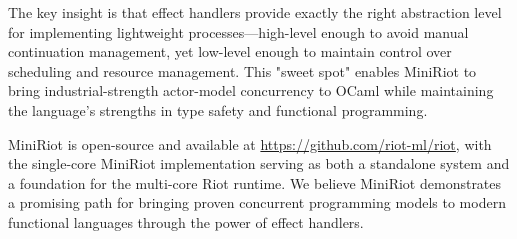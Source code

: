 \documentclass[sigplan,screen]{acmart}
\begin{document}
The key insight is that effect handlers provide exactly the right abstraction level for implementing lightweight processes—high-level enough to avoid manual continuation management, yet low-level enough to maintain control over scheduling and resource management. This "sweet spot" enables MiniRiot to bring industrial-strength actor-model concurrency to OCaml while maintaining the language's strengths in type safety and functional programming.

MiniRiot is open-source and available at \url{https://github.com/riot-ml/riot}, with the single-core MiniRiot implementation serving as both a standalone system and a foundation for the multi-core Riot runtime. We believe MiniRiot demonstrates a promising path for bringing proven concurrent programming models to modern functional languages through the power of effect handlers.



\end{document}
